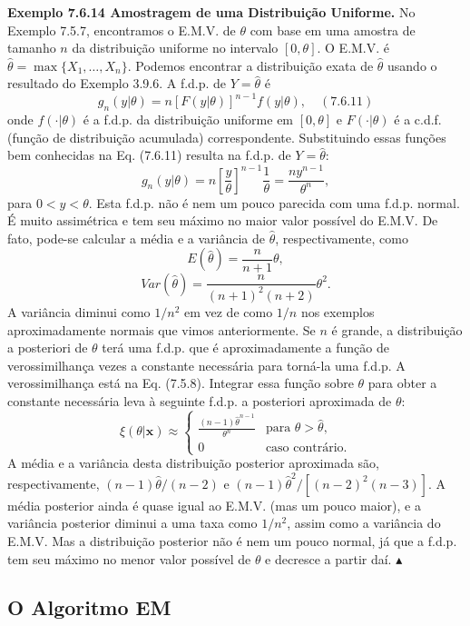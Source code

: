 \textbf{Exemplo 7.6.14 Amostragem de uma Distribuição Uniforme.} No Exemplo 7.5.7, encontramos o E.M.V. de $\theta$ com base em uma amostra de tamanho $n$ da distribuição uniforme no intervalo $[0, \theta]$. O E.M.V. é $\hat{\theta} = \max\{X_1, \dots, X_n\}$. Podemos encontrar a distribuição exata de $\hat{\theta}$ usando o resultado do Exemplo 3.9.6. A f.d.p. de $Y=\hat{\theta}$ é
$$ g_n(y|\theta) = n[F(y|\theta)]^{n-1}f(y|\theta), \quad (7.6.11) $$
onde $f(\cdot|\theta)$ é a f.d.p. da distribuição uniforme em $[0, \theta]$ e $F(\cdot|\theta)$ é a c.d.f. (função de distribuição acumulada) correspondente. Substituindo essas funções bem conhecidas na Eq. (7.6.11) resulta na f.d.p. de $Y=\hat{\theta}$:
$$ g_n(y|\theta) = n\left[\frac{y}{\theta}\right]^{n-1}\frac{1}{\theta} = \frac{ny^{n-1}}{\theta^n}, $$
para $0 < y < \theta$. Esta f.d.p. não é nem um pouco parecida com uma f.d.p. normal. É muito assimétrica e tem seu máximo no maior valor possível do E.M.V. De fato, pode-se calcular a média e a variância de $\hat{\theta}$, respectivamente, como
$$ E(\hat{\theta}) = \frac{n}{n+1}\theta, $$
$$ Var(\hat{\theta}) = \frac{n}{(n+1)^2(n+2)}\theta^2. $$
A variância diminui como $1/n^2$ em vez de como $1/n$ nos exemplos aproximadamente normais que vimos anteriormente.
Se $n$ é grande, a distribuição a posteriori de $\theta$ terá uma f.d.p. que é aproximadamente a função de verossimilhança vezes a constante necessária para torná-la uma f.d.p. A verossimilhança está na Eq. (7.5.8). Integrar essa função sobre $\theta$ para obter a constante necessária leva à seguinte f.d.p. a posteriori aproximada de $\theta$:
$$ \xi(\theta|\mathbf{x}) \approx \begin{cases} \frac{(n-1)\hat{\theta}^{n-1}}{\theta^n} & \text{para } \theta > \hat{\theta}, \\ 0 & \text{caso contrário}. \end{cases} $$
A média e a variância desta distribuição posterior aproximada são, respectivamente, $(n-1)\hat{\theta}/(n-2)$ e $(n-1)\hat{\theta}^2/[(n-2)^2(n-3)]$. A média posterior ainda é quase igual ao E.M.V. (mas um pouco maior), e a variância posterior diminui a uma taxa como $1/n^2$, assim como a variância do E.M.V. Mas a distribuição posterior não é nem um pouco normal, já que a f.d.p. tem seu máximo no menor valor possível de $\theta$ e decresce a partir daí. $\blacktriangle$

\subsection*{O Algoritmo EM}


